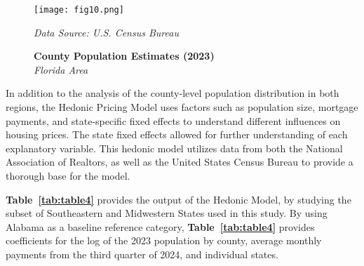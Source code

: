 \documentclass[journal,article,submit,pdftex,moreauthors]{Definitions/mdpi}
\begin{document}
\begin{figure}[H]
  \centering
  \texttt{[image: fig10.png]}
  \caption{\textbf{County Population Estimates (2023)}\\\textit{Florida Area}}
  \label{fig:figure10}
  \vspace{1ex}
  {\footnotesize\textit{Data Source: U.S. Census Bureau}}
\end{figure}

In addition to the analysis of the county-level population distribution in both regions, the Hedonic Pricing Model uses factors such as population size, mortgage payments, and state-specific fixed effects to understand different influences on housing prices. The state fixed effects allowed for further understanding of each explanatory variable. This hedonic model utilizes data from both the National Association of Realtors, as well as the United States Census Bureau to provide a thorough base for the model.

\begin{comment}
\textcolor{red}{
In addition to the analysis of the county-level population distribution in both regions, the Hedonic Pricing Model uses factors such as population size, mortgage payments, and state-specific fixed effects to understand different influences on housing prices. The state fixed effects allowed for further understanding of each explanatory variable. This hedonic model utilizes data from both the National Association of Realtors, as well as the United States Census Bureau to provide a thorough base for the model.
}
\end{comment}

\textbf{Table~\ref{tab:table4}} provides the output of the Hedonic Model, by studying the subset of Southeastern and Midwestern States used in this study. By using Alabama as a baseline reference category, \textbf{Table~\ref{tab:table4}} provides coefficients for the log of the 2023 population by county, average monthly payments from the third quarter of 2024, and individual states.
\end{document}

